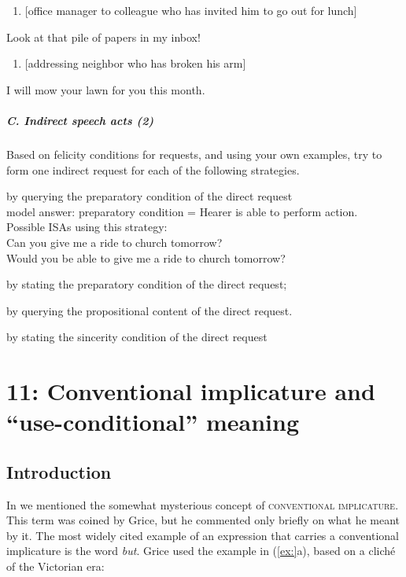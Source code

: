 \begin{enumerate}
\item 
\textrm{[office manager to colleague who has invited him to go out for lunch]}
\end{enumerate}
\rmfamily
Look at that pile of papers in my inbox!


\begin{enumerate}
\item 
\textrm{[addressing neighbor who has broken his arm]}
\end{enumerate}
\rmfamily
I will mow your lawn for you this month.


\paragraph{C. Indirect speech acts (2)}

Based on felicity conditions for requests, and using your own examples, try to form one indirect request for each of the following strategies.

\ea
\ea by querying the preparatory condition of the direct request\\
\textsf{model answer: preparatory condition = Hearer is able to perform action.\\
Possible ISAs using this strategy:\\
Can you give me a ride to church tomorrow?\\
Would you be able to give me a ride to church tomorrow?}

\ex by stating the preparatory condition of the direct request;

\ex by querying the propositional content of the direct request.

\ex by stating the sincerity condition of the direct request
\z
\z

\chapter{{11}: Conventional implicature and “use-conditional” meaning}

\section{Introduction}\label{sec:} %

In  we mentioned the somewhat mysterious concept of \textsc{conventional implicature}. This term was coined by Grice, but he commented only briefly on what he meant by it. The most widely cited example of an expression that carries a conventional implicature is the word \textit{but}. Grice used the example in (\ref{ex:}a), based on a cliché of the Victorian era:


